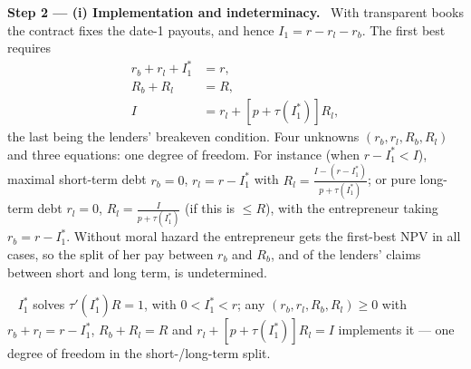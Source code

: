 \documentclass[11pt,a4paper]{article}
\newcommand{\step}[2]{\par\medskip\noindent\textbf{Step #1 --- #2.}~}
\newcommand{\answer}[1]{\par\smallskip\noindent\fbox{\textbf{Answer #1.}}~}
\begin{document}
\step{2}{(i) Implementation and indeterminacy} With transparent books the contract fixes the date-1
payouts, and hence $I_1=r-r_l-r_b$. The first best requires
\begin{align}
  r_b+r_l+I_1^* &= r, \label{t5e9-c1}\\
  R_b+R_l &= R, \label{t5e9-c2}\\
  I &= r_l+[p+\tau(I_1^*)]R_l, \label{t5e9-c3}
\end{align}
the last being the lenders' breakeven condition. Four unknowns $(r_b,r_l,R_b,R_l)$ and three equations: one
degree of freedom. For instance (when $r-I_1^*<I$), maximal short-term debt $r_b=0$, $r_l=r-I_1^*$ with
$R_l=\frac{I-(r-I_1^*)}{p+\tau(I_1^*)}$; or pure long-term debt $r_l=0$, $R_l=\frac{I}{p+\tau(I_1^*)}$ (if this is $\le R$),
with the entrepreneur taking $r_b=r-I_1^*$. Without moral hazard the entrepreneur gets the first-best NPV in all
cases, so the split of her pay between $r_b$ and $R_b$, and of the lenders' claims between short and long
term, is undetermined.

\answer{(i)} $I_1^*$ solves $\tau'(I_1^*)R=1$, with $0<I_1^*<r$; any $(r_b,r_l,R_b,R_l)\ge0$ with
$r_b+r_l=r-I_1^*$, $R_b+R_l=R$ and $r_l+[p+\tau(I_1^*)]R_l=I$ implements it --- one degree of freedom
in the short-/long-term split.
\end{document}
